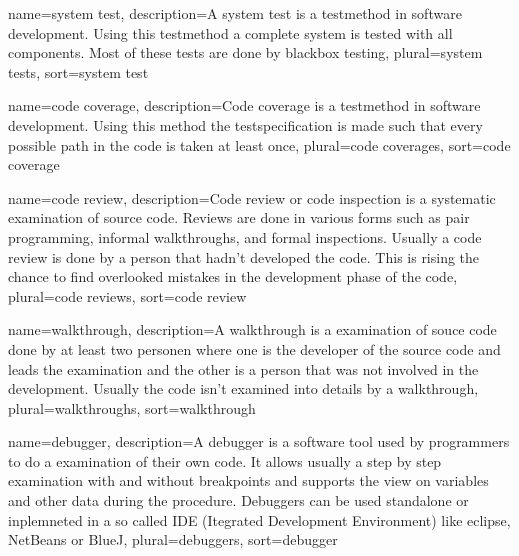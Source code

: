 {
	name={system test},
	description={A system test is a testmethod in software development.
		Using this testmethod a complete system is tested with all
		components. Most of these tests are done by
		\gls{blackbox testing}},
	plural={system tests},
	sort={system test}
}

{
	name={code coverage},
	description={Code coverage is a testmethod in software development.
		Using this method the testspecification is made such that
		every possible path in the code is taken at least once},
	plural={code coverages},
	sort={code coverage}
}

{
	name={code review},
	description={Code review or code inspection is a systematic
		examination of source code. Reviews are done in various 
		forms such as pair programming, informal walkthroughs, 
		and formal inspections. Usually a code review is done
		by a person that hadn't developed the code. This is rising
		the chance to find overlooked mistakes in the development
		phase of the code},
	plural={code reviews},
	sort={code review}
}

{
	name=walkthrough,
	description={A walkthrough is a examination of souce code done by
		at least two personen where one is the developer of the 
		source code and leads the examination and the other is a
		person that was not involved in the development. Usually
		the code isn't examined into details by a walkthrough},
	plural=walkthroughs,
	sort=walkthrough
}

{
	name=debugger,
	description={A debugger is a software tool used by programmers to
		do a examination of their own code. It allows usually a 
		step by step examination with and without breakpoints and
		supports the view on variables and other data during the
		procedure. Debuggers can be used standalone or inplemneted
		in a so called IDE (Itegrated Development Environment) like
		eclipse, NetBeans or BlueJ},
	plural=debuggers,
	sort=debugger
}

